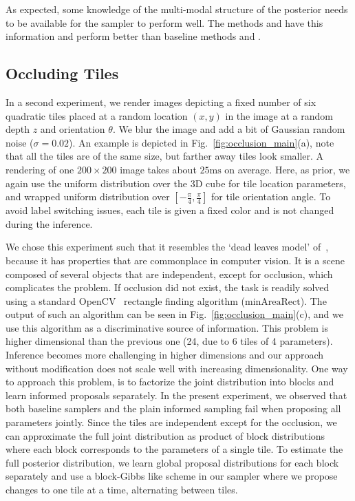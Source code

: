 As expected, some knowledge of the multi-modal structure of the
posterior needs to be available for the sampler to perform
well. The methods \INDLMH and \MIXLMH have this
information and perform better than baseline methods and \REGMH.


\subsection{Occluding Tiles}
\label{sec:tiles}

In a second experiment, we render images depicting a fixed number
of six quadratic tiles placed at a random location $(x, y)$ in the image at a
random depth $z$ and orientation $\theta$. We blur the image and add
a bit of Gaussian random noise ($\sigma = 0.02$). An example is
depicted in Fig.~\ref{fig:occlusion_main}(a), note that all the
tiles are of the same size, but farther away tiles look smaller. A rendering
of one $200 \times 200$ image takes about $25\textrm{ms}$ on average. Here, as prior,
we again use the uniform distribution over the 3D cube for tile location parameters, and
wrapped uniform distribution over $[-\frac{\pi}{4},\frac{\pi}{4}]$ for tile orientation angle.
To avoid label switching issues, each tile is given a fixed color and is not changed during the inference.

%
We chose this experiment such that it resembles the `dead leaves model'
of~\cite{lee2001occlusion}, because it has properties that are
commonplace in computer vision. It is a scene composed of several
objects that are independent, except for occlusion, which complicates
the problem. If occlusion did not exist, the task is readily solved
using a standard OpenCV~\cite{bradski2008opencv} rectangle finding
algorithm ($\textrm{minAreaRect}$). The output of such an algorithm can be seen
in Fig.~\ref{fig:occlusion_main}(c), and we use this algorithm as a discriminative
source of information. This problem is higher dimensional than the
previous one (24, due to 6 tiles of 4 parameters). Inference becomes
more challenging in higher dimensions and our approach without
modification does not scale well with increasing dimensionality. One
way to approach this problem, is to factorize the joint distribution
into blocks and learn informed proposals separately. In the present
experiment, we observed that both baseline samplers and the plain
informed sampling fail when proposing all parameters jointly. Since
the tiles are independent except for the occlusion, we can approximate
the full joint distribution as product of block distributions where
each block corresponds to the parameters of a single tile. To estimate the full
posterior distribution, we learn global proposal distributions for
each block separately and use a block-Gibbs like scheme in our sampler
where we propose changes to one tile at a time, alternating between tiles.

